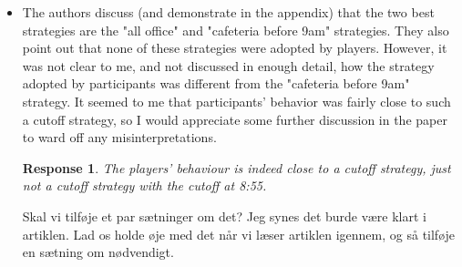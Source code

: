 \documentclass[a4paper]{article}
\newtheorem{response}{Response}
\newenvironment{tobo}{\smallskip \noindent \color{yellow!80!black!80}}{\color{black}\smallskip}
\begin{document}
\begin{itemize}
 \item The authors discuss (and demonstrate in the appendix) that the two best strategies are the "all office" and "cafeteria before 9am" strategies. They also point out that none of these strategies were adopted by players. However, it was not clear to me, and not discussed in enough detail, how the strategy adopted by participants was different from the "cafeteria before 9am" strategy. It seemed to me that participants' behavior was fairly close to such a cutoff strategy, so I would appreciate some further discussion in the paper to ward off any misinterpretations.
 \begin{response}
 The players' behaviour is indeed close to a cutoff strategy, just not a cutoff strategy with the cutoff at 8:55. 
 \end{response}
 \begin{tobo}
 Skal vi tilføje et par sætninger om det? Jeg synes det burde være klart i artiklen. Lad os holde øje med det når vi læser artiklen igennem, og så tilføje en sætning om nødvendigt.
 \end{tobo}
 
\end{itemize}
\end{document}

